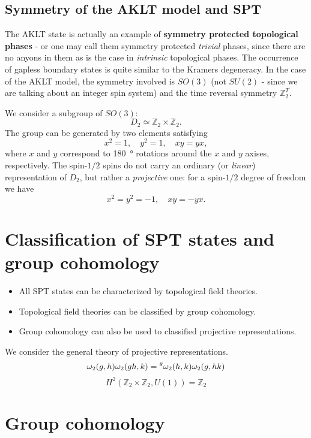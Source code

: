 \documentclass[hyperref, a4paper]{article}
\newcommand*{\concept}[1]{{\textbf{#1}}}
\begin{document}
\subsection{Symmetry of the AKLT model and SPT}

The AKLT state is actually an example of \concept{symmetry protected topological phases} - or one may call them symmetry protected \emph{trivial} phases, since there are no anyons in them as is the case in \emph{intrinsic} topological phases. 
The occurrence of gapless boundary states is quite similar to the Kramers degeneracy.
In the case of the AKLT model, the symmetry involved is $SO(3)$ (not $SU(2)$ - since we are talking about an integer spin system) and the time reversal symmetry $\mathbb{Z}_2^T$.

We consider a subgroup of $SO(3)$:
\begin{equation}
    D_2 \simeq \mathbb{Z}_2 \times \mathbb{Z}_2.
\end{equation}
The group can be generated by two elements satisfying
\begin{equation}
    x^2 = 1, \quad y^2 = 1, \quad xy = yx,
\end{equation}
where $x$ and $y$ correspond to \SI{180}{\degree} rotations around the $x$ and $y$ axises, respectively.
The spin-$1/2$ spins do not carry an ordinary (or \emph{linear}) representation of $D_2$, but rather a \emph{projective} one: for a spin-$1/2$ degree of freedom we have 
\begin{equation}
    x^2 = y^2 = -1, \quad xy = - yx.
\end{equation}

\section{Classification of SPT states and group cohomology}

\begin{itemize}
    \item All SPT states can be characterized by topological field theories.
    \item Topological field theories can be classified by group cohomology.
    \item Group cohomology can also be used to classified projective representations.
\end{itemize}

We consider the general theory of projective representations.
\begin{equation}
    \omega_2(g, h) \omega_2(gh, k) = \prescript{g}{}{\omega_2(h, k)} \omega_2(g, hk)
\end{equation}
\begin{equation}
    H^2(\mathbb{Z}_2 \times \mathbb{Z}_2, U(1)) = \mathbb{Z}_2
\end{equation}

\section{Group cohomology}


 
\end{document}
